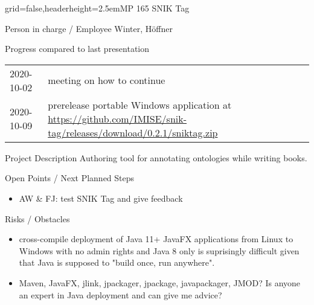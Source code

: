\documentclass[english]{kiesgrube}
\begin{document}
\newpage

\begin{poster}{grid=false,headerheight=2.5em}{}{MP 165 SNIK Tag}{}{}
\begin{posterbox}[name=person,column=0,row=0]{Person in charge / Employee}
Winter, Höffner
\end{posterbox}
\begin{posterbox}[name=progress,below=person]{Progress compared to last presentation}
\begin{tabulary}{\textwidth}{lL}
2020-10-02	&meeting on how to continue\\
2020-10-09	&prerelease portable Windows application at \url{https://github.com/IMISE/snik-tag/releases/download/0.2.1/sniktag.zip}\\
\end{tabulary}
\end{posterbox}
\begin{posterbox}[name=description,column=1,row=0]{Project Description}
\small
Authoring tool for annotating ontologies while writing books.
\end{posterbox}
\begin{posterbox}[name=open,column=1,below=description]{Open Points / Next Planned Steps}
\begin{itemize}
\item AW \& FJ: test SNIK Tag and give feedback
\end{itemize}
\end{posterbox}
\begin{posterbox}[name=risks,column=1,below=open]{Risks / Obstacles}
\begin{itemize}
\item cross-compile deployment of Java 11+ JavaFX applications from Linux to Windows with no admin rights and Java 8 only is suprisingly difficult given that Java is supposed to "build once, run anywhere".
\item Maven, JavaFX, jlink, jpackager, jpackage, javapackager, JMOD? Is anyone an expert in Java deployment and can give me advice?

\end{itemize}
\end{posterbox}
\end{poster}
\end{document}
